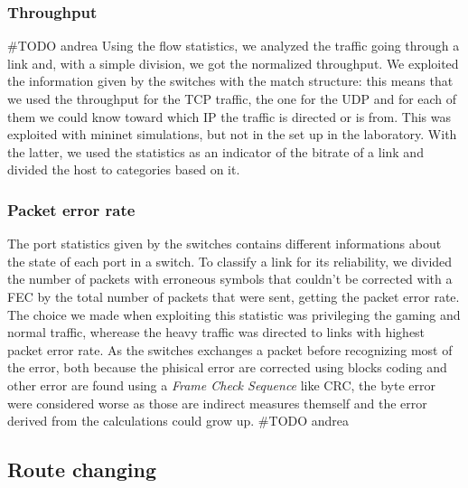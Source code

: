 \documentclass[article,10pt]{IEEEtran}
\begin{document}
  \subsubsection{Throughput}
	\#TODO andrea
	Using the flow statistics, we analyzed the traffic going through a link and, with a simple division, we got the normalized throughput.
	We exploited the information given by the switches with the match structure: this means that we used the throughput for the TCP traffic,
	the one for the UDP and for each of them we could know toward which IP the traffic is directed or is from. This was exploited with mininet
	simulations, but not in the set up in the laboratory. With the latter, we used the statistics as an indicator of the bitrate of a link
	and divided the host to categories based on it.
\\
\subsubsection{Packet error rate}

The port statistics given by the switches contains different informations about the state of each port in a switch. To classify a link for its
reliability, we divided the number of packets with erroneous symbols that couldn't be corrected with a FEC by the total number of packets that were sent,
getting the packet error rate. The choice we made when exploiting this statistic was privileging the gaming and normal traffic, wherease the
heavy traffic was directed to links with highest packet error rate.  As the switches exchanges a packet before recognizing most of the error, both because the
phisical error are corrected using blocks coding and other error are found using a \textit{Frame Check Sequence} like CRC, the byte error were considered worse as
those are indirect measures themself and the error derived from the calculations could grow up.
\#TODO andrea
\\
\subsection{Route changing} %
\end{document}
